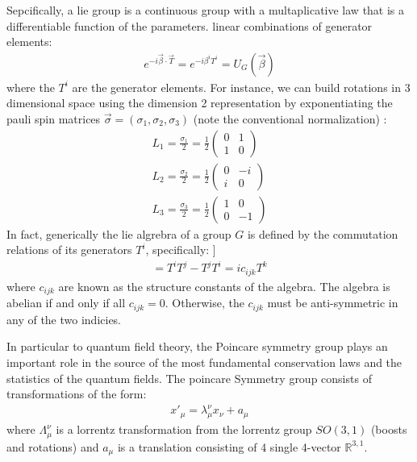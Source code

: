 Sepcifically, a lie group is a continuous group with a multaplicative law that is a differentiable function of the parameters. linear combinations of generator elements:
\begin{align*}
e^{-i\vec \beta \cdot \vec T} = e^{-i\beta^i T^i} = U_{G}(\vec \beta)
\end{align*}
where the $T^i$ are the generator elements. 
For instance, we can build rotations in 3 dimensional space 
using the dimension 2 representation by exponentiating the pauli spin matrices $\vec \sigma = (\sigma_1, \sigma_2, \sigma_3)$ 
(note the conventional normalization) :
\begin{align*}
L_1 = \frac{\sigma_1}{2} = \frac{1}{2} \begin{pmatrix} 0 & 1 \\ 1 & 0 \end{pmatrix} \\
L_2 = \frac{\sigma_2}{2} = \frac{1}{2} \begin{pmatrix} 0 & -i \\ i & 0 \end{pmatrix}\\
L_3 = \frac{\sigma_3}{2} =  \frac{1}{2} \begin{pmatrix} 1 & 0 \\ 0 & -1 \end{pmatrix} 
\end{align*}
In fact, generically the lie algrebra of a group $G$ is defined by the commutation relations of its generators $T^i$, 
specifically:
]\begin{align*}
[T^i, T^j] = T^iT^j - T^jT^i=  i c_{ijk} T^k
\end{align*}
where $c_{ijk}$ are known as the structure constants of the algebra. The algebra is abelian 
if and only if all $c_{ijk}=0$. Otherwise, the $c_{ijk}$ must be anti-symmetric in any of the two indicies. 

In particular to quantum field theory, the Poincare symmetry group plays an important role in the 
source of the most fundamental conservation laws and the statistics of the quantum fields. 
The poincare Symmetry group consists of transformations of the form:
\begin{align*}
x'_\mu = \lambda^\nu_\mu x_\nu + a_\mu 
\end{align*}
where $\Lambda^\nu_\mu$ is a lorrentz transformation from the lorrentz group $SO(3,1)$ (boosts and rotations) and 
$a_\mu$ is a translation consisting of 4 single 4-vector $\mathbb{R}^{3,1}$. 

